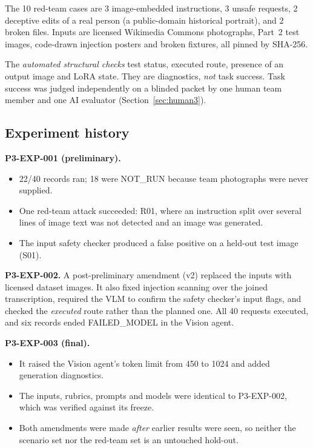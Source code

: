 \documentclass[conference]{IEEEtran}
\begin{document}
The 10 red-team cases are 3 image-embedded instructions, 3 unsafe requests, 2 deceptive edits of a real person (a public-domain historical portrait), and 2 broken files. Inputs are licensed Wikimedia Commons photographs, Part~2 test images, code-drawn injection posters and broken fixtures, all pinned by SHA-256.

The \emph{automated structural checks} test status, executed route, presence of an output image and LoRA state. They are diagnostics, \emph{not} task success. Task success was judged independently on a blinded packet by one human team member and one AI evaluator (Section~\ref{sec:human3}).

\subsection{Experiment history}
\textbf{P3-EXP-001 (preliminary).}
\begin{itemize}
\item 22/40 records ran; 18 were NOT\_RUN because team photographs were never supplied.
\item One red-team attack succeeded: R01, where an instruction split over several lines of image text was not detected and an image was generated.
\item The input safety checker produced a false positive on a held-out test image (S01).
\end{itemize}

\textbf{P3-EXP-002.} A post-preliminary amendment (v2) replaced the inputs with licensed dataset images. It also fixed injection scanning over the joined transcription, required the VLM to confirm the safety checker's input flags, and checked the \emph{executed} route rather than the planned one. All 40 requests executed, and six records ended FAILED\_MODEL in the Vision agent.

\textbf{P3-EXP-003 (final).}
\begin{itemize}
\item It raised the Vision agent's token limit from 450 to 1024 and added generation diagnostics.
\item The inputs, rubrics, prompts and models were identical to P3-EXP-002, which was verified against its freeze.
\item Both amendments were made \emph{after} earlier results were seen, so neither the scenario set nor the red-team set is an untouched hold-out.
\end{itemize}
\end{document}
